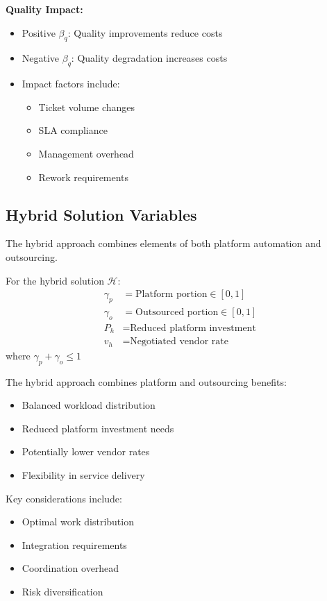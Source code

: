 \documentclass[12pt,a4paper]{article}
\newenvironment{definition}[1]
{\begin{mdframed}[style=definitionstyle,frametitle={Definition: #1}]}
{\end{mdframed}}
\newenvironment{explanation}
{\begin{mdframed}[style=explanationstyle,frametitle={Explanation}]}
{\end{mdframed}}
\newenvironment{observation}
{\begin{mdframed}[style=observationstyle,frametitle={Observation}]}
{\end{mdframed}}
\begin{document}
\begin{observation}
\textbf{Quality Impact:}
\begin{itemize}
    \item Positive $\beta_q$: Quality improvements reduce costs
    \item Negative $\beta_q$: Quality degradation increases costs
    \item Impact factors include:
        \begin{itemize}
            \item Ticket volume changes
            \item SLA compliance
            \item Management overhead
            \item Rework requirements
        \end{itemize}
\end{itemize}
\end{observation}

\subsection{Hybrid Solution Variables}
The hybrid approach combines elements of both platform automation and outsourcing.

\begin{definition}{Hybrid Variables}
For the hybrid solution $\mathcal{H}$:
\begin{align*}
    \gamma_p &= \text{Platform portion} \in [0,1] \\
    \gamma_o &= \text{Outsourced portion} \in [0,1] \\
    P_h &= \text{Reduced platform investment} \\
    v_h &= \text{Negotiated vendor rate}
\end{align*}
where $\gamma_p + \gamma_o \leq 1$
\end{definition}

\begin{explanation}
The hybrid approach combines platform and outsourcing benefits:
\begin{itemize}
    \item Balanced workload distribution
    \item Reduced platform investment needs
    \item Potentially lower vendor rates
    \item Flexibility in service delivery
\end{itemize}

Key considerations include:
\begin{itemize}
    \item Optimal work distribution
    \item Integration requirements
    \item Coordination overhead
    \item Risk diversification
\end{itemize}
\end{explanation}
\end{document}

